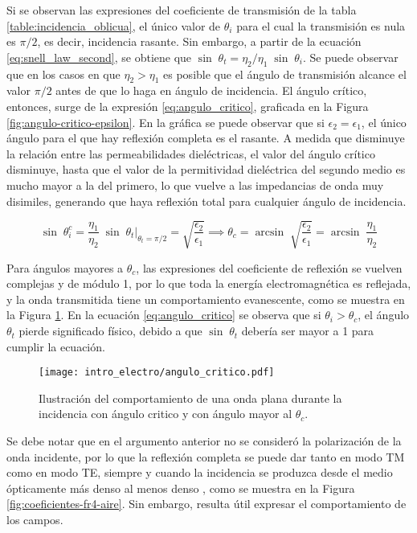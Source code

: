 Si se observan las expresiones del coeficiente de transmisión de la tabla \ref{table:incidencia_oblicua}, el único valor de $\theta_i$ para el cual la transmisión es nula es $\pi/2$, es decir, incidencia rasante. Sin embargo, a partir de la ecuación \ref{eq:snell_law_second}, se obtiene que $\sin \; \theta_t = \eta_2 / \eta_1\; \sin\; \theta_i$. Se puede observar que en los casos en que $\eta_2 > \eta_1$ es posible que el ángulo de transmisión alcance el valor $\pi/2$ antes de que lo haga en ángulo de incidencia. El ángulo crítico, entonces, surge de la expresión \ref{eq:angulo_critico}, graficada en la Figura \ref{fig:angulo-critico-epsilon}. En la gráfica se puede observar que si $\epsilon_2 = \epsilon_1$, el único ángulo para el que hay reflexión completa es el rasante. A medida que disminuye la relación entre las permeabilidades dieléctricas, el valor del ángulo crítico disminuye, hasta que el valor de la permitividad dieléctrica del segundo medio es mucho mayor a la del primero, lo que vuelve a las impedancias de onda muy disimiles, generando que haya reflexión total para cualquier ángulo de incidencia.

\begin{equation}
	\label{eq:angulo_critico}
	\sin\; \theta_i^c = \frac{\eta_1}{\eta_2}\;\sin \; \theta_t|_{\theta_t=\pi/2} = \sqrt{\frac{\epsilon_2}{\epsilon_1}} \implies \theta_c = \arcsin \;\sqrt{\frac{\epsilon_2}{\epsilon_1}} = \arcsin \;\frac{\eta_1}{\eta_2}
\end{equation}

Para ángulos mayores a $\theta_c$, las expresiones del coeficiente de reflexión se vuelven complejas y de módulo 1, por lo que toda la energía electromagnética es reflejada, y la onda transmitida tiene un comportamiento evanescente, como se muestra en la Figura \ref{fig:angulo_critico}. En la ecuación \ref{eq:angulo_critico} se observa que si $\theta_i > \theta_c$, el ángulo $\theta_t$ pierde significado físico, debido a que $\sin\; \theta_t$ debería ser mayor a 1 para cumplir la ecuación.

\begin{figure}[htp]
	\centering
	\texttt{[image: intro\_electro/angulo\_critico.pdf]}
	\caption{Ilustración del comportamiento de una onda plana durante la incidencia con ángulo critico y con ángulo mayor al $\theta_c$.}
	\label{fig:angulo_critico}
\end{figure}

Se debe notar que en el argumento anterior no se consideró la polarización de la onda incidente, por lo que la reflexión completa se puede dar tanto en modo TM como en modo TE, siempre y cuando la incidencia se produzca desde el medio ópticamente más denso al menos denso \cite{Fernandez:Electromag}, como se muestra en la Figura \ref{fig:coeficientes-fr4-aire}. Sin embargo, resulta útil expresar el comportamiento de los campos.

